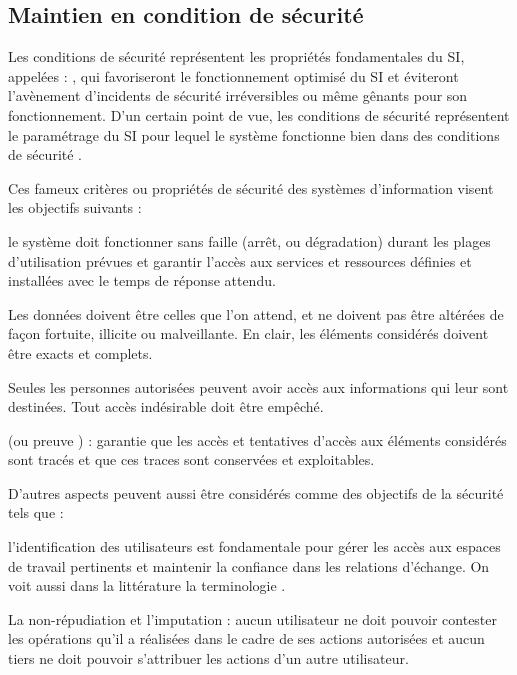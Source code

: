 \subsection{Maintien en condition de sécurité}

Les conditions de sécurité représentent les propriétés fondamentales du SI, appelées :  , qui favoriseront le fonctionnement optimisé du SI et éviteront l'avènement d'incidents de sécurité irréversibles ou même gênants pour son fonctionnement. D'un certain point de vue, les conditions de sécurité représentent le paramétrage du SI pour lequel le système fonctionne bien dans des conditions de sécurité .

Ces fameux critères \textbf{} ou propriétés de sécurité des systèmes d'information visent les objectifs suivants :
\begin{nota}[DISPONIBILITE]
le système doit fonctionner sans faille (arrêt, ou dégradation) durant les plages d'utilisation prévues et garantir l'accès aux services et ressources définies et installées avec le temps de réponse attendu.
\end{nota}
\begin{nota}[INTEGRITE]
Les données doivent être celles que l'on attend, et ne doivent pas être altérées de façon fortuite, illicite ou malveillante. En clair, les éléments considérés doivent être exacts et complets.
\end{nota}
\begin{nota}[CONFIDENTIALITE] Seules les personnes autorisées peuvent avoir accès aux informations qui leur sont destinées. Tout accès indésirable doit être empêché.
\end{nota}
\begin{nota}[TRACABILITE] (ou preuve ) : garantie que les accès et tentatives d'accès aux éléments considérés sont tracés et que ces traces sont conservées et exploitables.
\end{nota}
D'autres aspects peuvent aussi être considérés comme des objectifs de la sécurité tels que :
\begin{nota}[AUTHENTICITE]
l'identification des utilisateurs est fondamentale pour gérer les accès aux espaces de travail pertinents et maintenir la confiance dans les relations d'échange. On voit aussi dans la littérature la terminologie .
\end{nota}
\begin{nota}
La non-répudiation et l'imputation : aucun utilisateur ne doit pouvoir contester les opérations qu'il a réalisées dans le cadre de ses actions autorisées et aucun tiers ne doit pouvoir s'attribuer les actions d'un autre utilisateur.
\end{nota}

